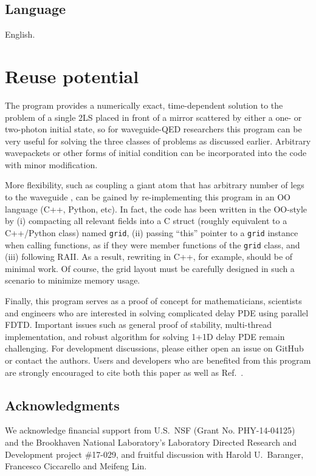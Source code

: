 \documentclass[12pt,letter,onecolumn,notitlepage]{article}
\begin{document}
\subsection{Language}
English.

\section{Reuse potential}
The program provides a numerically exact, time-dependent solution to the problem of a single 2LS placed in front of a mirror scattered by either a one- or two-photon initial state, so for waveguide-QED researchers this program can be very useful for solving the three classes of problems as discussed earlier. Arbitrary wavepackets or other forms of initial condition can be incorporated into the code with minor modification. 

More flexibility, such as coupling a giant atom that has arbitrary number of legs to the waveguide \cite{GustafssonSci14,FriskKockumPRA14,GuoPRA17,GiantAtom}, can be gained by re-implementing this program in an OO language (C++, Python, etc). In fact, the code has been written in the OO-style by (i) compacting all relevant fields into a C struct (roughly equivalent to a C++/Python class) named \texttt{grid}, (ii) passing ``this'' pointer to a \texttt{grid} instance when calling functions, as if they were member functions of the \texttt{grid} class, and (iii) following RAII. As a result, rewriting in C++, for example, should be of minimal work. Of course, the grid layout must be carefully designed in such a scenario to minimize memory usage. %

Finally, this program serves as a proof of concept for mathematicians, scientists and engineers who are interested in solving complicated delay PDE using parallel FDTD. Important issues such as general proof of stability, multi-thread implementation, and robust algorithm for solving 1+1D delay PDE remain challenging. For development discussions, please either open an issue on GitHub or contact the authors. Users and developers who are benefited from this program are strongly encouraged to cite both this paper as well as Ref.~\cite{FangNM17}.

\subsection{Acknowledgments}
	We acknowledge financial support from U.S.\ NSF (Grant No. PHY-14-04125) and the Brookhaven National Laboratory's Laboratory Directed Research and Development project \#17-029, and fruitful discussion with Harold U.\ Baranger, Francesco Ciccarello and Meifeng Lin.
\end{document}
